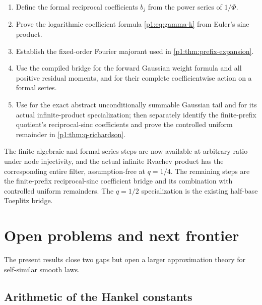 \documentclass[11pt]{article}
\numberwithin{equation}{section}
\theoremstyle{definition}
\theoremstyle{remark}
\begin{document}
\begin{enumerate}
\item Define the formal reciprocal coefficients $b_j$ from the power series of $1/\Phi$.
\item Prove the logarithmic coefficient formula \eqref{p1:eq:gamma-k} from Euler's sine product.
\item Establish the fixed-order Fourier majorant used in \cref{p1:thm:prefix-expansion}.
\item Use the compiled  bridge for the
      forward Gaussian weight formula and all positive residual moments, and
       for their complete coefficientwise
      action on a formal series.
\item Use  for the exact abstract
      unconditionally summable Gaussian tail and
       for its actual infinite-product
      specialization; then separately identify the finite-prefix quotient's
      reciprocal-sinc coefficients and prove the controlled uniform remainder
      in \cref{p1:thm:q-richardson}.
\end{enumerate}
The finite algebraic and formal-series steps are now available at arbitrary
ratio under node injectivity, and the actual infinite Rvachev product has the
corresponding entire filter, assumption-free at \(q=1/4\).  The remaining
steps are the finite-prefix reciprocal-sinc coefficient bridge and its
combination with controlled uniform remainders.  The
\(q=1/2\) specialization is the existing half-base Toeplitz bridge.

\section{Open problems and next frontier}
\label{p1:sec:open}

The present results close two gaps but open a larger approximation theory for self-similar smooth laws.

\subsection{Arithmetic of the Hankel constants}
\end{document}
